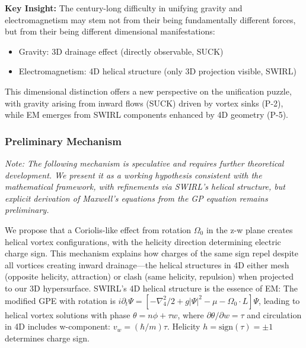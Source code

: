 \textbf{Key Insight:} The century-long difficulty in unifying gravity and electromagnetism may stem not from their being fundamentally different forces, but from their being different dimensional manifestations:
\begin{itemize}
\item Gravity: 3D drainage effect (directly observable, SUCK)
\item Electromagnetism: 4D helical structure (only 3D projection visible, SWIRL)
\end{itemize}
This dimensional distinction offers a new perspective on the unification puzzle, with gravity arising from inward flows (SUCK) driven by vortex sinks (P-2), while EM emerges from SWIRL components enhanced by 4D geometry (P-5).

\subsubsection{Preliminary Mechanism}
\textit{Note: The following mechanism is speculative and requires further theoretical development. We present it as a working hypothesis consistent with the mathematical framework, with refinements via SWIRL's helical structure, but explicit derivation of Maxwell's equations from the GP equation remains preliminary.}

We propose that a Coriolis-like effect from rotation $\Omega_0$ in the z-w plane creates helical vortex configurations, with the helicity direction determining electric charge sign. This mechanism explains how charges of the same sign repel despite all vortices creating inward drainage---the helical structures in 4D either mesh (opposite helicity, attraction) or clash (same helicity, repulsion) when projected to our 3D hypersurface. SWIRL's 4D helical structure is the essence of EM: The modified GPE with rotation is $i\partial_t\Psi = [-\nabla_4^2/2 + g|\Psi|^2 - \mu - \Omega_0\cdot L]\Psi$, leading to helical vortex solutions with phase $\theta = n\phi + \tau w$, where $\partial\theta/\partial w = \tau$ and circulation in 4D includes w-component: $v_w = (\hbar/m)\tau$. Helicity $h = \text{sign}(\tau) = \pm1$ determines charge sign.

